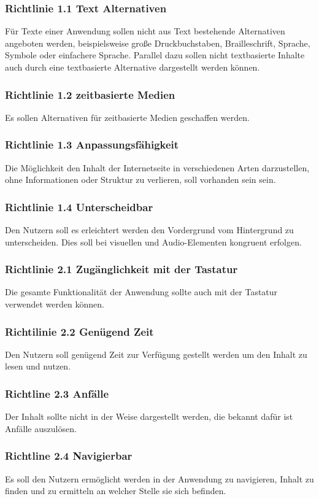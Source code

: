 \documentclass[12pt, paper=a4, bibtotoc, toc=listof, headsepline=true]{scrreprt}
\begin{document}
			\subsubsection{Richtlinie 1.1 Text Alternativen}
			Für Texte einer Anwendung sollen nicht aus Text bestehende Alternativen angeboten werden, beispielsweise große Druckbuchstaben, Brailleschrift, Sprache, Symbole oder einfachere Sprache. Parallel dazu sollen nicht textbasierte Inhalte auch durch eine textbasierte Alternative dargestellt werden können. 
			\subsubsection{Richtlinie 1.2 zeitbasierte Medien}
			Es sollen Alternativen für zeitbasierte Medien geschaffen werden.
			\subsubsection{Richtlinie 1.3 Anpassungsfähigkeit}
			Die Möglichkeit den Inhalt der Internetseite in verschiedenen Arten darzustellen, ohne Informationen oder Struktur zu verlieren, soll vorhanden sein sein.
			\subsubsection{Richtlinie 1.4 Unterscheidbar}
			Den Nutzern soll es erleichtert werden den Vordergrund vom Hintergrund zu unterscheiden. Dies soll bei visuellen und Audio-Elementen kongruent erfolgen. 
			\subsubsection{Richtlinie 2.1 Zugänglichkeit mit der Tastatur}
			Die gesamte Funktionalität der Anwendung sollte auch mit der Tastatur verwendet werden können.
			\subsubsection{Richtilinie 2.2 Genügend Zeit}
			Den Nutzern soll genügend Zeit zur Verfügung gestellt werden um den Inhalt zu lesen und nutzen.
			\subsubsection{Richtline 2.3 Anfälle}
			Der Inhalt sollte nicht in der Weise dargestellt werden, die bekannt dafür ist Anfälle auszulösen.
			\subsubsection{Richtline 2.4 Navigierbar}
			Es soll den Nutzern ermöglicht werden in der Anwendung zu navigieren, Inhalt zu finden und zu ermitteln an welcher Stelle sie sich befinden.
\end{document}
